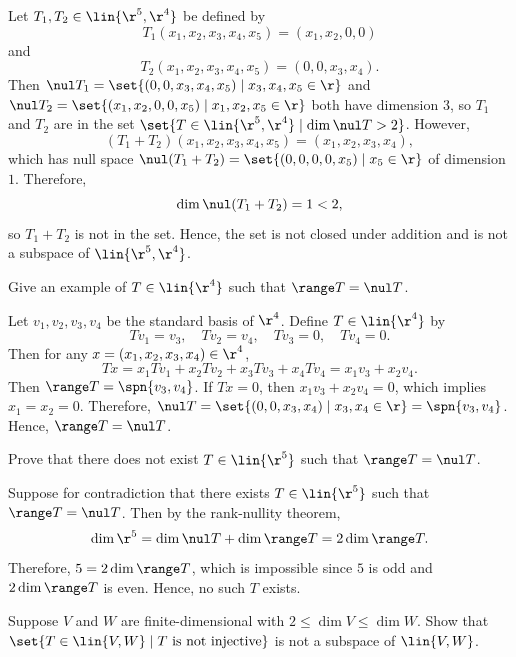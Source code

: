 \begin{sol}
    Let $T_1, T_2 \in \lin{\r^5, \r^4}$ be defined by
    \[T_1(x_1, x_2, x_3, x_4, x_5) = (x_1, x_2, 0, 0)\]
    and
    \[T_2(x_1, x_2, x_3, x_4, x_5) = (0, 0, x_3, x_4).\]
    Then $\nul T_1 = \set{(0, 0, x_3, x_4, x_5) \mid x_3, x_4, x_5 \in \r}$ and $\nul T_2 = \set{(x_1, x_2, 0, 0, x_5) \mid x_1, x_2, x_5 \in \r}$ both have dimension $3$, so $T_1$ and $T_2$ are in the set $\set{T \in \lin{\r^5, \r^4} \mid \dim \nul T > 2}$. However,
    \[(T_1 + T_2)(x_1, x_2, x_3, x_4, x_5) = (x_1, x_2, x_3, x_4),\]
    which has null space $\nul(T_1 + T_2) = \set{(0, 0, 0, 0, x_5) \mid x_5 \in \r}$ of dimension $1$. Therefore,
    \[\dim \nul(T_1 + T_2) = 1 < 2,\]
    so $T_1 + T_2$ is not in the set. Hence, the set is not closed under addition and is not a subspace of $\lin{\r^5, \r^4}$.
\end{sol}

\begin{exercise}[3b5]
    Give an example of $T \in \lin{\r^4}$ such that $\range T = \nul T$.
\end{exercise}

\begin{sol}
    Let $v_1, v_2, v_3, v_4$ be the standard basis of $\r^4$. Define $T \in \lin{\r^4}$ by
    \[Tv_1 = v_3, \quad Tv_2 = v_4, \quad Tv_3 = 0, \quad Tv_4 = 0.\]
    Then for any $x = (x_1, x_2, x_3, x_4) \in \r^4$,
    \[Tx = x_1 Tv_1 + x_2 Tv_2 + x_3 Tv_3 + x_4 Tv_4 = x_1 v_3 + x_2 v_4.\]
    Then $\range T = \spn{v_3, v_4}$. If $Tx = 0$, then $x_1 v_3 + x_2 v_4 = 0$, which implies $x_1 = x_2 = 0$. Therefore, $\nul T = \set{(0, 0, x_3, x_4) \mid x_3, x_4 \in \r} = \spn{v_3, v_4}$. Hence, $\range T = \nul T$.
\end{sol}

\begin{exercise}[3b6]
    Prove that there does not exist $T \in \lin{\r^5}$ such that $\range T = \nul T$.
\end{exercise}

\begin{sol}
    Suppose for contradiction that there exists $T \in \lin{\r^5}$ such that $\range T = \nul T$. Then by the rank-nullity theorem,
    \[\dim \r^5 = \dim \nul T + \dim \range T = 2\dim \range T.\]
    Therefore, $5 = 2\dim \range T$, which is impossible since $5$ is odd and $2\dim \range T$ is even. Hence, no such $T$ exists.
\end{sol}

\begin{exercise}[3b7]
    Suppose $V$ and $W$ are finite-dimensional with $2 \leq \dim V \leq \dim W$. Show that $\set{T \in \lin{V, W} \mid T \text{ is not injective}}$ is not a subspace of $\lin{V, W}$.
\end{exercise}

